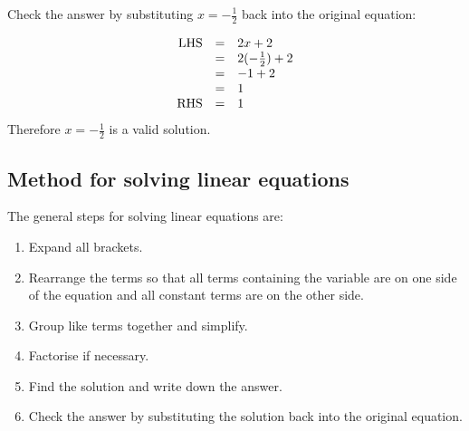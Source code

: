\begin{equation*}

\end{equation*}
Check the answer by substituting $x=-\frac{1}{2}$ back into the original equation:

\begin{equation*}
    \begin{array}{ccl}\hfill \mbox{LHS}& =& 2x+2\hfill \\
	  & =& 2(-\frac{1}{2})+2\hfill \\
	  & =& -1+2\hfill \\
	  & =& 1\hfill \\
	  \hfill \mbox{RHS}& =& 1\hfill \\
    \end{array}
\end{equation*}
Therefore $x = -\frac{1}{2}$ is a valid solution.


\subsection*{Method for solving linear equations}

The general steps for solving linear equations are:
\begin{enumerate}[noitemsep, label=\textbf{\arabic*}. ] 
    \item  Expand all brackets.
    \item Rearrange the terms so that all terms containing the variable are on one side of the equation and all constant terms are on the other side.
    \item  Group like terms together and simplify.
\item Factorise if necessary.
    \item  Find the solution and write down the answer.
    \item Check the answer by substituting the solution back into the original equation.
\end{enumerate}


% 


